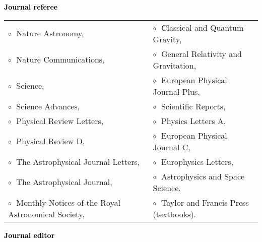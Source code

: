 \textbf{\textcolor{black}{Journal referee}}\vspace{0.1cm}\\
\begin{tabular}{@{\hskip 0.4cm}l@{\hskip 0.4in}l}
$\circ\;$ Nature Astronomy,  & $\circ\;$  Classical and Quantum Gravity,   \\
$\circ\;$ Nature Communications,  & $\circ\;$   General Relativity and Gravitation,  \\
$\circ\;$ Science, & $\circ\;$  European Physical Journal Plus,  \\
$\circ\;$ Science Advances, & $\circ\;$ Scientific Reports, \\
$\circ\;$ Physical Review Letters, & $\circ\;$ Physics Letters A, \\
$\circ\;$ Physical Review D,  & $\circ\;$ European Physical Journal C,  \\
$\circ\;$  The Astrophysical Journal Letters,  &  $\circ\;$  Europhysics Letters, \\
$\circ\;$ The Astrophysical Journal,  &  $\circ\;$ Astrophysics and Space Science. \\
$\circ\;$  Monthly Notices of the Royal Astronomical Society, & $\circ\;$ Taylor and Francis Press (textbooks). \\
\end{tabular}
\vspace{0.2cm}

 \textbf{\textcolor{black}{Journal editor}}\vspace{0.1cm}\\
 \vspace{-0.1cm}
\vspace{0.2cm}

